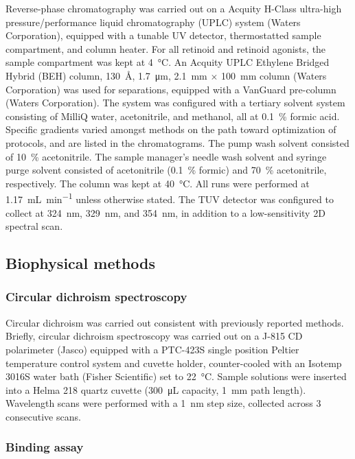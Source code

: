\begin{refsection}
Reverse-phase chromatography was carried out on a Acquity H-Class ultra-high
pressure/performance liquid chromatography (UPLC) system (Waters Corporation),
equipped with a tunable UV detector, thermostatted sample compartment, and
column heater. For all retinoid and retinoid agonists, the sample compartment
was kept at \SI{4}{\celsius}. An Acquity UPLC Ethylene Bridged Hybrid (BEH)  column,
\SI{130}{\angstrom}, \SI{1.7}{\um}, \SI{2.1}{\mm} ${\times}$ \SI{100}{\mm}
column (Waters Corporation) was used for separations, equipped with a VanGuard
 pre-column (Waters Corporation). The system was configured with a
tertiary solvent system consisting of MilliQ water, acetonitrile, and methanol,
all at \SI{0.1}{\percent} formic acid. Specific gradients varied amongst methods
on the path toward optimization of protocols, and are listed in the
chromatograms. The pump wash solvent consisted of \SI{10}{\percent}
acetonitrile. The sample manager's needle wash solvent and syringe purge solvent
consisted of acetonitrile (\SI{0.1}{\percent} formic) and \SI{70}{\percent}
acetonitrile, respectively. The column was kept at \SI{40}{\celsius}. All runs
were performed at \SI{1.17}{\mL\per\minute} unless otherwise stated. The TUV
detector was configured to collect at \SI{324}{\nm}, \SI{329}{\nm}, and
\SI{354}{\nm}, in addition to a low-sensitivity 2D spectral scan.

\subsection{Biophysical methods}

\subsubsection{Circular dichroism spectroscopy}

Circular dichroism was carried out consistent with previously reported
methods.\cite{Haghpanah2009,Gunasekar2009,Haghpanah2010,Yuvienco2012} Briefly,
circular dichroism spectroscopy was carried out on a J-815 CD polarimeter
(Jasco) equipped with a PTC-423S single position Peltier temperature control
system and cuvette holder, counter-cooled with an Isotemp 3016S water bath
(Fisher Scientific) set to \SI{22}{\celsius}. Sample solutions were inserted
into a Helma 218 quartz cuvette (\SI{300}{\uL} capacity, \SI{1}{\mm} path
length). Wavelength scans were performed with a \SI{1}{\nm} step size, collected
across 3 consecutive scans.

\subsubsection{Binding assay}


\end{refsection}
